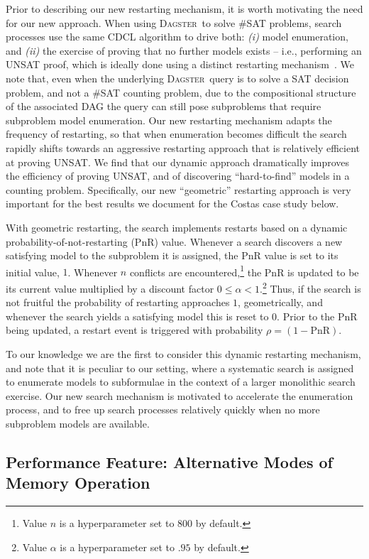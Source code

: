 \documentclass[10pt,a4paper,oneside,headinclude,footinclude,BCOR5mm]{scrartcl}
\newcommand{\dagster}{\textsc{Dagster}\xspace}
\begin{document}
Prior to describing our new restarting mechanism, it is worth motivating the need for our new approach.
When using \dagster\ to solve \#SAT problems, search processes use the same CDCL algorithm to drive both: {\em (i)}  model enumeration, and {\em (ii)} the exercise of proving that no further models exists -- i.e., performing an UNSAT proof, which is ideally done using a distinct restarting mechanism~\cite{oh2015between}.
We note that, even when the underlying \dagster\ query is to solve a SAT decision problem, and not a \#SAT counting problem, due to the compositional structure of the associated DAG the query can still pose subproblems that require subproblem model enumeration. 
Our new restarting mechanism adapts the frequency of restarting, so that when enumeration becomes difficult the search rapidly shifts towards an aggressive restarting approach that is relatively efficient at proving UNSAT.
We find that our dynamic approach dramatically improves the efficiency of proving UNSAT, and of discovering ``hard-to-find'' models in a counting problem.
Specifically, our new ``geometric'' restarting approach is very important for the best results we document for the Costas case study below.

With geometric restarting, the search implements restarts based on a dynamic probability-of-not-restarting (PnR) value.
Whenever a search discovers a new satisfying model to the subproblem it is assigned, the PnR value is set to its initial value, $1$.
Whenever $n$ conflicts are encountered,\footnote{Value $n$ is a hyperparameter set to $800$ by default.} the PnR is updated to be its current value multiplied by a discount factor $0 \leq \alpha <1$.\footnote{Value $\alpha$ is a hyperparameter set to $.95$ by default.}
Thus, if the search is not fruitful the probability of restarting approaches $1$, geometrically, and whenever the search yields a satisfying model this is reset to $0$.
Prior to the PnR being updated, a restart event is triggered with probability $\rho=(1 - \text{PnR})$.

To our knowledge we are the first to consider this dynamic restarting mechanism, and note that it is peculiar to our setting, where a systematic search is assigned to enumerate models to subformulae in the context of a larger monolithic search exercise.
Our new search mechanism is motivated to accelerate the enumeration process, and to free up search processes relatively quickly when no more subproblem models are available. 


\subsection{Performance Feature: Alternative Modes of Memory Operation}\label{sec:memory_operation}
\end{document}
